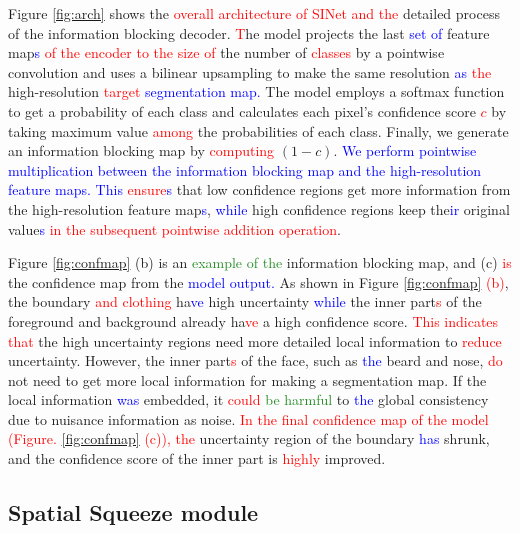 \documentclass[10pt,twocolumn,letterpaper]{article}
\newcommand\Lars[1]{\textcolor{blue}{#1}}
\newcommand\yj[1]{\textcolor{ForestGreen}{#1}}
\newcommand\nj[1]{\textcolor{red}{#1}}
\newcommand\Lars[1]{#1}
\newcommand\yj[1]{#1}
\newcommand\nj[1]{#1}
\begin{document}
Figure \ref{fig:arch} shows the \nj{overall architecture of SINet and the} detailed process of the information blocking decoder. 
\nj{T}he model projects the last \Lars{set of} feature map\Lars{s} \nj{of the encoder to the size of} the number of \nj{classes} by a pointwise convolution and uses a bilinear upsampling to make the same resolution \Lars{as} \nj{the} high-resolution \nj{target} \Lars{segmentation map. }The model employs a softmax function to get a probability of each class and calculates each pixel's confidence score \nj{$c$} by taking maximum value \nj{among} the probabilities of each class.
Finally, we generate an information blocking map by \nj{computing} $(1-c)$. \Lars{We perform pointwise multiplication between the information blocking map and the high-resolution feature maps. This \nj{ensure\Lars{s}}} that low confidence regions get more information from the high-resolution feature map\Lars{s}, \Lars{while} high confidence regions keep the\Lars{ir} original value\Lars{s} \nj{in the subsequent pointwise addition operation}.

Figure \ref{fig:confmap} (b) is an \yj{example of the} information blocking map, and (c) \nj{is} the confidence map from the \Lars{model output. }As shown in Figure \ref{fig:confmap} \nj{(b)}, the boundary \nj{and clothing} ha\Lars{ve} high uncertainty \Lars{while} the inner part\nj{s} of the foreground and background already ha\nj{ve} a high confidence score.
\nj{This indicates that} the high uncertainty regions need more detailed local information to \nj{reduce} uncertainty.
However, the inner part\nj{s} of the face, such as \Lars{the} beard and nose, \nj{do} not need to get more local information for making a segmentation map.
If the local information \Lars{was} embedded, it \yj{\nj{could} be harmful} to \Lars{the} global consistency due to nuisance information as noise.
\nj{In the final confidence map of the model (Figure. \ref{fig:confmap} (c)), 
the} uncertainty region of the boundary \Lars{has} shrunk, and the confidence score of the inner part is \nj{highly} improved.















\subsection{Spatial Squeeze module}
\label{S2}
\end{document}
